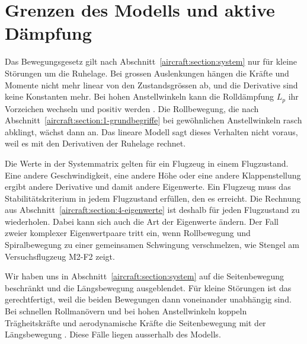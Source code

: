 %
%
%
%
%
\section{Grenzen des Modells und aktive Dämpfung
\label{aircraft:section:grenzen}}
Das Bewegungsgesetz gilt nach Abschnitt~\ref{aircraft:section:system} nur für
kleine Störungen um die Ruhelage.
Bei grossen Auslenkungen hängen die Kräfte und Momente nicht mehr linear von den
Zustandsgrössen ab, und die Derivative sind keine Konstanten mehr.
Bei hohen Anstellwinkeln kann die Rolldämpfung $L_p$ ihr Vorzeichen wechseln und
positiv werden \cite{aircraft:stengel}.
Die Rollbewegung, die nach Abschnitt~\ref{aircraft:section:1-grundbegriffe} bei
gewöhnlichen Anstellwinkeln rasch abklingt, wächst dann an.
Das lineare Modell sagt dieses Verhalten nicht voraus, weil es mit den
Derivativen der Ruhelage rechnet.

Die Werte in der Systemmatrix gelten für ein Flugzeug in einem Flugzustand.
Eine andere Geschwindigkeit, eine andere Höhe oder eine andere Klappenstellung
ergibt andere Derivative und damit andere Eigenwerte.
Ein Flugzeug muss das Stabilitätskriterium in jedem Flugzustand erfüllen, den
es erreicht.
Die Rechnung aus Abschnitt~\ref{aircraft:section:4-eigenwerte} ist deshalb für
jeden Flugzustand zu wiederholen.
Dabei kann sich auch die Art der Eigenwerte ändern.
Der Fall zweier komplexer Eigenwertpaare tritt ein, wenn Rollbewegung und
Spiralbewegung zu einer gemeinsamen Schwingung verschmelzen, wie
Stengel \cite{aircraft:stengel} am Versuchsflugzeug M2-F2 zeigt.

Wir haben uns in Abschnitt~\ref{aircraft:section:system} auf die
Seitenbewegung beschränkt und die Längsbewegung ausgeblendet.
Für kleine Störungen ist das gerechtfertigt, weil die beiden Bewegungen dann
voneinander unabhängig sind.
Bei schnellen Rollmanövern und bei hohen Anstellwinkeln koppeln Trägheitskräfte
und aerodynamische Kräfte die Seitenbewegung mit der Längsbewegung
\cite{aircraft:nelson}.
Diese Fälle liegen ausserhalb des Modells.

